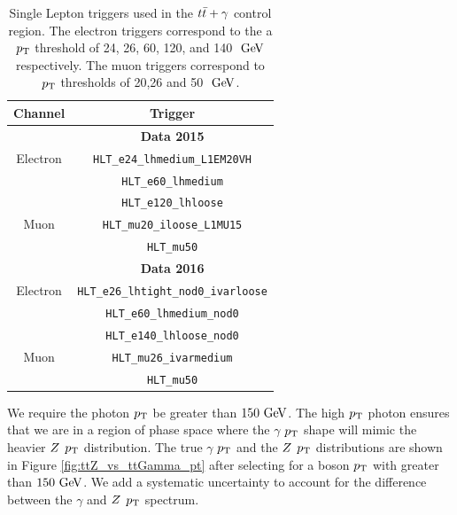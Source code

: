 \begin{table}[h!]
  \caption{Single Lepton triggers used in the $t\bar{t}+\gamma$ control region.  The electron triggers correspond to the a $p_{\mathrm{T}}$ threshold of 24, 26, 60, 120, and 140 $\gev$ respectively.  The muon triggers correspond to $p_{\mathrm{T}}$ thresholds of 20,26 and 50 $\gev$. }
  \label{tb:lepTriggers}
  \begin{center}
    \begin{tabular}{c|c} \hline\hline
      Channel & Trigger \\  \hline
              & {\bf Data 2015} \\ \hline
      Electron & \verb+HLT_e24_lhmedium_L1EM20VH+  \\
      	            & \verb+HLT_e60_lhmedium+ \\
	            & \verb+HLT_e120_lhloose+         \\  
      Muon & \verb+HLT_mu20_iloose_L1MU15+ \\
      	       & \verb+HLT_mu50+ \\
      \hline
              & {\bf Data 2016} \\ \hline
      Electron & \verb+HLT_e26_lhtight_nod0_ivarloose+ \\
                     &\verb+HLT_e60_lhmedium_nod0+ \\
                     &\verb+HLT_e140_lhloose_nod0+         \\ 
      Muon & \verb+HLT_mu26_ivarmedium+ \\ 
                & \verb+HLT_mu50+ \\
      \hline \hline
    \end{tabular}
  \end{center}
\end{table}

\indent We require the photon $p_{\mathrm{T}}$ be greater than $150\gev$.  The high $p_{\mathrm{T}}$ photon ensures that we are in a region of phase space where the $\gamma$ $p_{\mathrm{T}}$ shape will mimic the heavier $Z$ $p_{\mathrm{T}}$ distribution.  The true $\gamma$ $p_{\mathrm{T}}$ and the $Z$ $p_{\mathrm{T}}$ distributions are shown in Figure \ref{fig:ttZ_vs_ttGamma_pt} after selecting for a boson $p_{\mathrm{T}}$ with greater than $150 \gev$.  We add a systematic uncertainty to account for the difference between the $\gamma$ and $Z$ $p_{\mathrm{T}}$ spectrum. \\

\pagebreak


